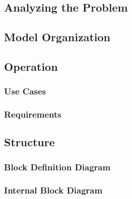 \subsection{Analyzing the Problem}


\blindtext %




\subsection{Model Organization}

\blindtext %




\subsection{Operation}


\blindtext %


\subsubsection{Use Cases}


\blindtext %


\subsubsection{Requirements}

\blindtext %




\subsection{Structure}

\blindtext %

\subsubsection{Block Definition Diagram}

\blindtext %

\subsubsection{Internal Block Diagram}

